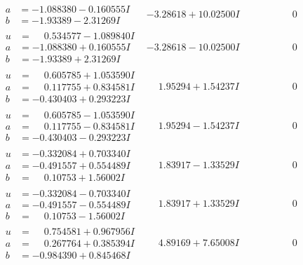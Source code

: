 \documentclass[1p]{elsarticle_modified}
\theoremstyle{definition}
\begin{document}
$$\begin{array}{c|c|c}
\begin{aligned}
a &= -1.088380 - 0.160555 I \\
b &= -1.93389 - 2.31269 I\end{aligned}
 & -3.28618 + 10.02500 I & \phantom{-0.000000 } 0 \\ \hline\begin{aligned}
u &= \phantom{-}0.534577 - 1.089840 I \\
a &= -1.088380 + 0.160555 I \\
b &= -1.93389 + 2.31269 I\end{aligned}
 & -3.28618 - 10.02500 I & \phantom{-0.000000 } 0 \\ \hline\begin{aligned}
u &= \phantom{-}0.605785 + 1.053590 I \\
a &= \phantom{-}0.117755 + 0.834581 I \\
b &= -0.430403 + 0.293223 I\end{aligned}
 & \phantom{-}1.95294 + 1.54237 I & \phantom{-0.000000 } 0 \\ \hline\begin{aligned}
u &= \phantom{-}0.605785 - 1.053590 I \\
a &= \phantom{-}0.117755 - 0.834581 I \\
b &= -0.430403 - 0.293223 I\end{aligned}
 & \phantom{-}1.95294 - 1.54237 I & \phantom{-0.000000 } 0 \\ \hline\begin{aligned}
u &= -0.332084 + 0.703340 I \\
a &= -0.491557 + 0.554489 I \\
b &= \phantom{-}0.10753 + 1.56002 I\end{aligned}
 & \phantom{-}1.83917 - 1.33529 I & \phantom{-0.000000 } 0 \\ \hline\begin{aligned}
u &= -0.332084 - 0.703340 I \\
a &= -0.491557 - 0.554489 I \\
b &= \phantom{-}0.10753 - 1.56002 I\end{aligned}
 & \phantom{-}1.83917 + 1.33529 I & \phantom{-0.000000 } 0 \\ \hline\begin{aligned}
u &= \phantom{-}0.754581 + 0.967956 I \\
a &= \phantom{-}0.267764 + 0.385394 I \\
b &= -0.984390 + 0.845468 I\end{aligned}
 & \phantom{-}4.89169 + 7.65008 I & \phantom{-0.000000 } 0 \\ \hline\begin{aligned}

\end{aligned}
\end{array}$$
\end{document}
